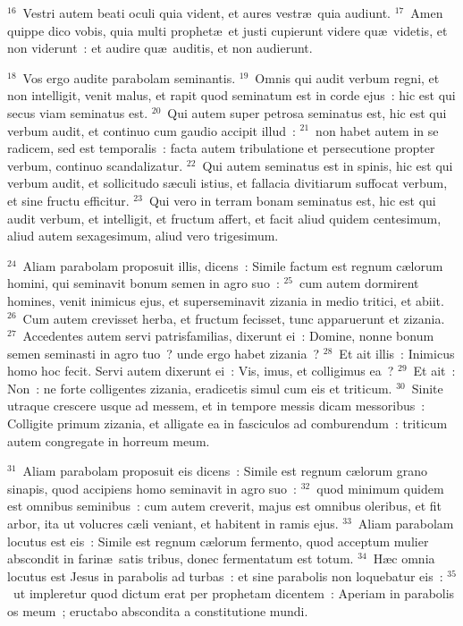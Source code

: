 ${}^{16}$~Vestri autem beati oculi quia vident, et aures vestr\ae\ quia audiunt.
${}^{17}$~Amen quippe dico vobis, quia multi prophet\ae\ et justi cupierunt videre qu\ae\ videtis, et non viderunt~: et audire qu\ae\ auditis, et non audierunt.


${}^{18}$~Vos ergo audite parabolam seminantis.
${}^{19}$~Omnis qui audit verbum regni, et non intelligit, venit malus, et rapit quod seminatum est in corde ejus~: hic est qui secus viam seminatus est.
${}^{20}$~Qui autem super petrosa seminatus est, hic est qui verbum audit, et continuo cum gaudio accipit illud~:
${}^{21}$~non habet autem in se radicem, sed est temporalis~: facta autem tribulatione et persecutione propter verbum, continuo scandalizatur.
${}^{22}$~Qui autem seminatus est in spinis, hic est qui verbum audit, et sollicitudo s\ae culi istius, et fallacia divitiarum suffocat verbum, et sine fructu efficitur.
${}^{23}$~Qui vero in terram bonam seminatus est, hic est qui audit verbum, et intelligit, et fructum affert, et facit aliud quidem centesimum, aliud autem sexagesimum, aliud vero trigesimum.


${}^{24}$~Aliam parabolam proposuit illis, dicens~: Simile factum est regnum c\ae lorum homini, qui seminavit bonum semen in agro suo~:
${}^{25}$~cum autem dormirent homines, venit inimicus ejus, et superseminavit zizania in medio tritici, et abiit.
${}^{26}$~Cum autem crevisset herba, et fructum fecisset, tunc apparuerunt et zizania.
${}^{27}$~Accedentes autem servi patrisfamilias, dixerunt ei~: Domine, nonne bonum semen seminasti in agro tuo~? unde ergo habet zizania~?
${}^{28}$~Et ait illis~: Inimicus homo hoc fecit. Servi autem dixerunt ei~: Vis, imus, et colligimus ea~?
${}^{29}$~Et ait~: Non~: ne forte colligentes zizania, eradicetis simul cum eis et triticum.
${}^{30}$~Sinite utraque crescere usque ad messem, et in tempore messis dicam messoribus~: Colligite primum zizania, et alligate ea in fasciculos ad comburendum~: triticum autem congregate in horreum meum.


${}^{31}$~Aliam parabolam proposuit eis dicens~: Simile est regnum c\ae lorum grano sinapis, quod accipiens homo seminavit in agro suo~:
${}^{32}$~quod minimum quidem est omnibus seminibus~: cum autem creverit, majus est omnibus oleribus, et fit arbor, ita ut volucres c\ae li veniant, et habitent in ramis ejus.
${}^{33}$~Aliam parabolam locutus est eis~: Simile est regnum c\ae lorum fermento, quod acceptum mulier abscondit in farin\ae\ satis tribus, donec fermentatum est totum.
${}^{34}$~H\ae c omnia locutus est Jesus in parabolis ad turbas~: et sine parabolis non loquebatur eis~:
${}^{35}$~ut impleretur quod dictum erat per prophetam dicentem~: Aperiam in parabolis os meum~; eructabo abscondita a constitutione mundi.


